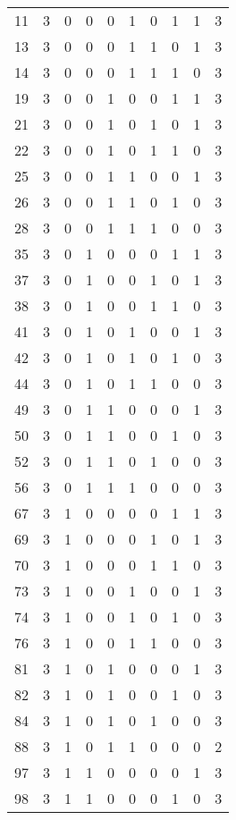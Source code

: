 \documentclass[a4paper,UKenglish]{lipics-v2016}
\begin{document}
\begin{longtable}[c]{|p{}||p{}||p{} p{} p{} p{} p{} p{} p{}|p{}|}
			11  & 3 & 0 & 0 & 0 & 1 & 0 & 1 & 1 & 3 \\
			13  & 3 & 0 & 0 & 0 & 1 & 1 & 0 & 1 & 3 \\
			14  & 3 & 0 & 0 & 0 & 1 & 1 & 1 & 0 & 3 \\		
			19  & 3 & 0 & 0 & 1 & 0 & 0 & 1 & 1 & 3 \\
			21  & 3 & 0 & 0 & 1 & 0 & 1 & 0 & 1 & 3 \\
			22  & 3 & 0 & 0 & 1 & 0 & 1 & 1 & 0 & 3 \\
			25  & 3 & 0 & 0 & 1 & 1 & 0 & 0 & 1 & 3 \\
			26  & 3 & 0 & 0 & 1 & 1 & 0 & 1 & 0 & 3 \\
			28  & 3 & 0 & 0 & 1 & 1 & 1 & 0 & 0 & 3 \\
			35  & 3 & 0 & 1 & 0 & 0 & 0 & 1 & 1 & 3 \\
			37  & 3 & 0 & 1 & 0 & 0 & 1 & 0 & 1 & 3 \\
			38  & 3 & 0 & 1 & 0 & 0 & 1 & 1 & 0 & 3 \\
			41  & 3 & 0 & 1 & 0 & 1 & 0 & 0 & 1 & 3 \\
			42  & 3 & 0 & 1 & 0 & 1 & 0 & 1 & 0 & 3 \\
			44  & 3 & 0 & 1 & 0 & 1 & 1 & 0 & 0 & 3 \\
			49  & 3 & 0 & 1 & 1 & 0 & 0 & 0 & 1 & 3 \\
			50  & 3 & 0 & 1 & 1 & 0 & 0 & 1 & 0 & 3 \\
			52  & 3 & 0 & 1 & 1 & 0 & 1 & 0 & 0 & 3 \\
			56  & 3 & 0 & 1 & 1 & 1 & 0 & 0 & 0 & 3 \\
			67  & 3 & 1 & 0 & 0 & 0 & 0 & 1 & 1 & 3 \\
			69  & 3 & 1 & 0 & 0 & 0 & 1 & 0 & 1 & 3 \\
			70  & 3 & 1 & 0 & 0 & 0 & 1 & 1 & 0 & 3 \\
			73  & 3 & 1 & 0 & 0 & 1 & 0 & 0 & 1 & 3 \\
			74  & 3 & 1 & 0 & 0 & 1 & 0 & 1 & 0 & 3 \\		
			76  & 3 & 1 & 0 & 0 & 1 & 1 & 0 & 0 & 3 \\
			81  & 3 & 1 & 0 & 1 & 0 & 0 & 0 & 1 & 3 \\
			82  & 3 & 1 & 0 & 1 & 0 & 0 & 1 & 0 & 3 \\
			84 & 3 & 1 & 0 & 1 & 0 & 1 & 0 & 0 & 3 \\
			88 & 3 & 1 & 0 & 1 & 1 & 0 & 0 & 0 & 2 \\
			97 & 3 & 1 & 1 & 0 & 0 & 0 & 0 & 1 & 3 \\
			98 & 3 & 1 & 1 & 0 & 0 & 0 & 1 & 0 & 3 \\

\end{longtable}
\end{document}
